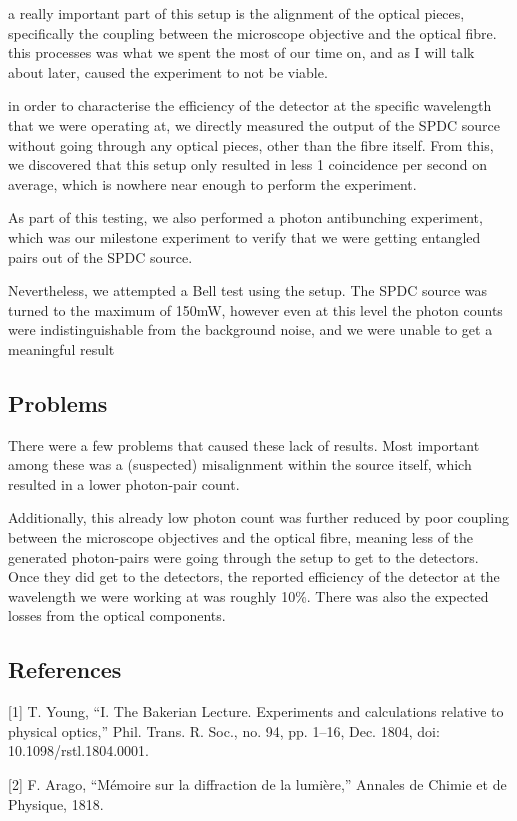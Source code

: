 \documentclass{article}
\begin{document}
a really important part of this setup is the alignment of the optical pieces, specifically the coupling between the microscope objective and the optical fibre. this processes was what we spent the most of our time on, and as I will talk about later, caused the experiment to not be viable.

in order to characterise the efficiency of the detector at the specific wavelength that we were operating at, we directly measured the output of the SPDC source without going through any optical pieces, other than the fibre itself. From this, we discovered that this setup only resulted in less 1 coincidence per second on average, which is nowhere near enough to perform the experiment.

As part of this testing, we also performed a photon antibunching experiment, which was our milestone experiment to verify that we were getting entangled pairs out of the SPDC source.

Nevertheless, we attempted a Bell test using the setup. The SPDC source was turned to the maximum of 150mW, however even at this level the photon counts were indistinguishable from the background noise, and we were unable to get a meaningful result

\subsection{Problems}
There were a few problems that caused these lack of results. Most important among these was a (suspected) misalignment within the source itself, which resulted in a lower photon-pair count.

Additionally, this already low photon count was further reduced by poor coupling between the microscope objectives and the optical fibre, meaning less of the generated photon-pairs were going through the setup to get to the detectors. Once they did get to the detectors, the reported efficiency of the detector at the wavelength we were working at was roughly 10\%. There was also the expected losses from the optical components.

\subsection{References}
[1] T. Young, “I. The Bakerian Lecture. Experiments and calculations relative to physical optics,” Phil. Trans. R. Soc., no. 94, pp. 1–16, Dec. 1804, doi: 10.1098/rstl.1804.0001.

[2] F. Arago, “Mémoire sur la diffraction de la lumière,” Annales de Chimie et de Physique, 1818.
\end{document}
